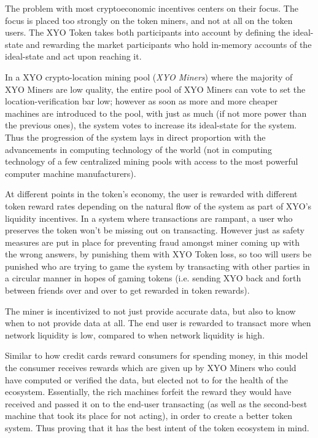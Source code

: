 \documentclass{article}
\begin{document}
The problem with most cryptoeconomic incentives centers on their focus. The focus is placed too strongly on the token miners, and not at all on the token users. The XYO Token takes both participants into account by defining the ideal-state and rewarding the market participants who hold in-memory accounts of the ideal-state and act upon reaching it.

In a XYO crypto-location mining pool (\textit{XYO Miners})  where the majority of XYO Miners are low quality, the entire pool of XYO Miners can vote to set the location-verification bar low; however as soon as more and more cheaper machines are introduced to the pool, with just as much (if not more power than the previous ones), the system votes to increase its ideal-state for the system. Thus the progression of the system lays in direct proportion with the advancements in computing technology of the world (not in computing technology of a few centralized mining pools with access to the most powerful computer machine manufacturers).

At different points in the token's economy, the user is rewarded with different token reward rates depending on the natural flow of the system as part of XYO's liquidity incentives. In a system where transactions are rampant, a user who preserves the token won't be missing out on transacting. However just as safety measures are put in place for preventing fraud amongst miner coming up with the wrong answers, by punishing them with XYO Token loss, so too will users be punished who are trying to game the system by transacting with other parties in a circular manner in hopes of gaming tokens (i.e. sending XYO back and forth between friends over and over to get rewarded in token rewards).


The miner is incentivized to not just provide accurate data, but also to know when to not provide data at all. The end user is rewarded to transact more when network liquidity is low, compared to when network liquidity is high.

Similar to how credit cards reward consumers for spending money, in this model the consumer receives rewards which are given up by XYO Miners who could have computed or verified the data, but elected not to for the health of the ecosystem. Essentially, the rich machines forfeit the reward they would have received and passed it on to the end-user transacting (as well as the second-best machine that took its place for not acting), in order to create a better token system. Thus proving that it has the best intent of the token ecosystem in mind.
\end{document}
